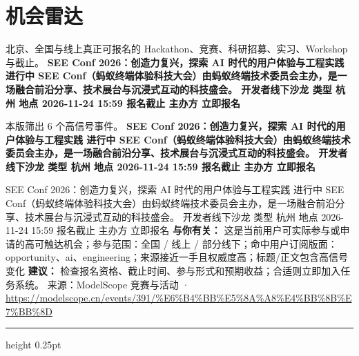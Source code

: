 \documentclass[10.5pt]{ctexart}
\begin{document}
\section*{机会雷达}
{\color{ormuted} 北京、全国与线上真正可报名的 Hackathon、竞赛、科研招募、实习、Workshop 与截止。}
\vspace{2mm}
{\LARGE\bfseries SEE Conf 2026：创造力复兴，探索 AI 时代的用户体验与工程实践 进行中 SEE Conf（蚂蚁终端体验科技大会）由蚂蚁终端技术委员会主办，是一场融合前沿分享、技术展台与沉浸式互动的科技盛会。 开发者线下沙龙 类型 杭州 地点 2026-11-24 15:59 报名截止 主办方 立即报名}\par
\vspace{1mm}
{\color{ormuted} 本版筛出 6 个高信号事件。}
\vspace{3mm}
{\Large\bfseries SEE Conf 2026：创造力复兴，探索 AI 时代的用户体验与工程实践 进行中 SEE Conf（蚂蚁终端体验科技大会）由蚂蚁终端技术委员会主办，是一场融合前沿分享、技术展台与沉浸式互动的科技盛会。 开发者线下沙龙 类型 杭州 地点 2026-11-24 15:59 报名截止 主办方 立即报名}\par
SEE Conf 2026：创造力复兴，探索 AI 时代的用户体验与工程实践 进行中 SEE Conf（蚂蚁终端体验科技大会）由蚂蚁终端技术委员会主办，是一场融合前沿分享、技术展台与沉浸式互动的科技盛会。 开发者线下沙龙 类型 杭州 地点 2026-11-24 15:59 报名截止 主办方 立即报名
\textbf{与你有关：} 这是当前用户可实际参与或申请的高可触达机会；参与范围：全国 / 线上 / 部分线下；命中用户订阅版面：opportunity、ai、engineering；来源接近一手且权威度高；标题/正文包含高信号变化
\textbf{建议：} 检查报名资格、截止时间、参与形式和预期收益；合适则立即加入任务系统。
{\footnotesize\color{ormuted} 来源：ModelScope 竞赛与活动 · \url{https://modelscope.cn/events/391/%E6%B4%BB%E5%8A%A8%E4%BB%8B%E7%BB%8D}}
\vspace{4mm}
\hrule height 0.25pt
\vspace{3mm}
\end{document}
